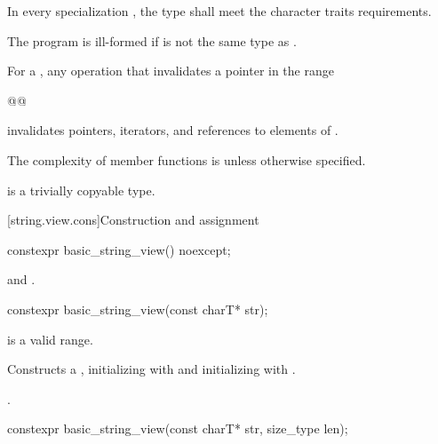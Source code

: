 \pnum
In every specialization , the type  shall meet the character traits requirements.
\begin{note}
The program is ill-formed if  is not the same type as .
\end{note}

\pnum
For a ,
any operation that invalidates a pointer
in the range
\begin{codeblock}
@@
\end{codeblock}
invalidates pointers, iterators, and references
to elements of .

\pnum
The complexity of  member functions is 
unless otherwise specified.

\pnum
{} is
a trivially copyable type.

[string.view.cons]{Construction and assignment}

%
\begin{itemdecl}
constexpr basic_string_view() noexcept;
\end{itemdecl}

\begin{itemdescr}
\pnum
\ensures
{} and .
\end{itemdescr}

%
\begin{itemdecl}
constexpr basic_string_view(const charT* str);
\end{itemdecl}

\begin{itemdescr}
\pnum
\expects
{} is a valid range.

\pnum
\effects
Constructs a , initializing  with 
and initializing  with .

\pnum
\complexity
{}.
\end{itemdescr}

%
\begin{itemdecl}
constexpr basic_string_view(const charT* str, size_type len);
\end{itemdecl}

